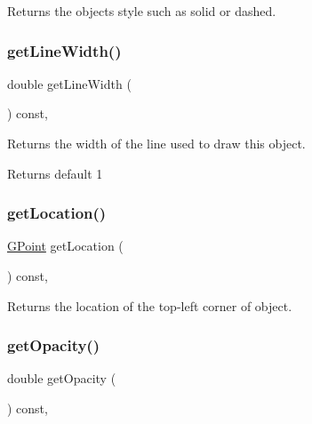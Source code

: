 Returns the object\textquotesingle{}s style such as solid or dashed. 

\mbox{\label{classsgl_1_1GObject_a85ff266dc3eb63d9f2d8e5a4487fd3c0}} 
\subsubsection{\texorpdfstring{get\+Line\+Width()}{getLineWidth()}}
{\footnotesize\ttfamily double get\+Line\+Width (\begin{DoxyParamCaption}{ }\end{DoxyParamCaption}) const\hspace{0.3cm}{\ttfamily [virtual]}, {\ttfamily [inherited]}}



Returns the width of the line used to draw this object. 

\begin{DoxyReturn}{Returns}
default 1 
\end{DoxyReturn}
\mbox{\label{classsgl_1_1GObject_a4f83802015511edeb63b892830812c11}} 
\subsubsection{\texorpdfstring{get\+Location()}{getLocation()}}
{\footnotesize\ttfamily \mbox{\hyperlink{structsgl_1_1GPoint}{G\+Point}} get\+Location (\begin{DoxyParamCaption}{ }\end{DoxyParamCaption}) const\hspace{0.3cm}{\ttfamily [virtual]}, {\ttfamily [inherited]}}



Returns the location of the top-\/left corner of object. 

\mbox{\label{classsgl_1_1GObject_a1ae3fc278cc5b71b9f2d96a8a83cdf26}} 
\subsubsection{\texorpdfstring{get\+Opacity()}{getOpacity()}}
{\footnotesize\ttfamily double get\+Opacity (\begin{DoxyParamCaption}{ }\end{DoxyParamCaption}) const\hspace{0.3cm}{\ttfamily [virtual]}, {\ttfamily [inherited]}}




